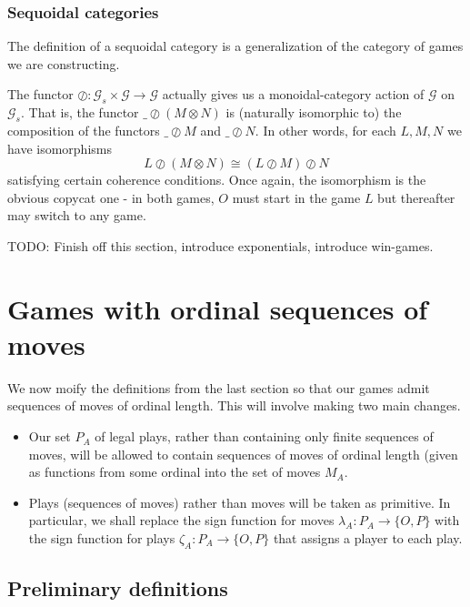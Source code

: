\documentclass[11pt]{article} %
\theoremstyle{plain} %
\theoremstyle{definition} %
\theoremstyle{exercisestyle}
\newcommand*\from{\colon}
\newcommand{\cmap}[3]{#1\from{}#2\to{}#3}
\newcommand{\tensor}{\otimes}
\newcommand{\sequoid}{\oslash}
\newcommand{\G}{\mathcal G}
\begin{document}
\subsubsection{Sequoidal categories}

The definition of a sequoidal category is a generalization of the category of games we are constructing.

The functor $\cmap{\sequoid}{\G_s\times\G}\G$ actually gives us a monoidal-category action of $\G$ on $\G_s$.  That is, the functor $\_\sequoid (M\tensor N)$ is (naturally isomorphic to) the composition of the functors $\_\sequoid M$ and $\_\sequoid N$.  In other words, for each $L,M,N$ we have isomorphisms
\[
  L\sequoid(M\tensor N)\cong (L\sequoid M)\sequoid N
\]
satisfying certain coherence conditions.  Once again, the isomorphism is the obvious copycat one - in both games, $O$ must start in the game $L$ but thereafter may switch to any game.  

TODO: Finish off this section, introduce exponentials, introduce win-games.

\section{Games with ordinal sequences of moves}

We now moify the definitions from the last section so that our games admit sequences of moves of ordinal length.  This will involve making two main changes.

\begin{itemize}
  \item Our set $P_A$ of legal plays, rather than containing only finite sequences of moves, will be allowed to contain sequences of moves of ordinal length (given as functions from some ordinal into the set of moves $M_A$.
  \item Plays (sequences of moves) rather than moves will be taken as primitive.  In particular, we shall replace the sign function for moves $\cmap{\lambda_A}{P_A}{\{O,P\}}$ with the sign function for plays $\cmap{\zeta_A}{P_A}{\{O,P\}}$ that assigns a player to each play.
\end{itemize}

\subsection{Preliminary definitions}
\end{document}
